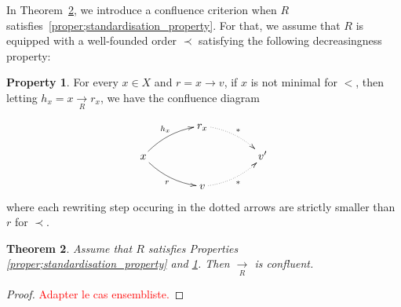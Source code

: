 \documentclass[10pt]{easychair}
\newtheorem{theorem}{Theorem}[section]
\theoremstyle{definition}
\newtheorem{property}[theorem]{Property}
\newcommand\rewR{\underset{R}{\longrightarrow}}
\newcommand\todo[1]{\textcolor{red}{#1.}}
\begin{document}
In Theorem~\ref{thm:confluence_criterion}, we introduce a confluence
criterion when $R$ satisfies~\ref{proper;standardisation_property}. For
that, we assume that $R$ is equipped with a well-founded order $\prec$
satisfying the following decreasingness property:

\begin{property}\label{proper:decreasingness_property}
  For every $x\in X$ and $r=x\to v$, if $x$ is not minimal for $<$, then
  letting $h_x=x\rewR r_x$, we have the confluence diagram
  
  \[
    \xymatrix @C = 4em @R = 1.5em{
      &
      r_x
      \ar@{.>}@/^/ [rd] ^{*}
      & \\
      x
      \ar@/^/ [ru] ^{h_x}
      \ar@/_/ [rd] _{r}
      &
      &
      v'
      \\
      &
      v
      \ar@{.>}@/_/  [ru] _{*}
      &
    }
  \]
  where each rewriting step occuring in the dotted arrows are strictly
  smaller than $r$ for $\prec$.
\end{property}

\begin{theorem}\label{thm:confluence_criterion}
  Assume that $R$ satisfies Properties
  \ref{proper;standardisation_property} and
  \ref{proper:decreasingness_property}. Then $\rewR$ is confluent.
\end{theorem}

\begin{proof}
  \todo{Adapter le cas ensembliste}
\end{proof}
\end{document}
